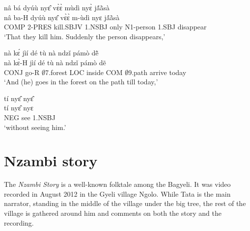 \begin{exe} 
\exA\label{25}
  \glll   nâ bá dyúù nyɛ̂ vɛ̀ɛ̀ mùdì nyɛ̀ jã́ã̀sà   \\
           nâ ba-H dyúù nyɛ̂ vɛ̀ɛ̀ m-ùdì nyɛ jã́ã̀sà      \\
         COMP 2-PRES kill.SBJV 1.NSBJ only N1-person 1.SBJ disappear \\
    \trans `That they kill him. Suddenly the person disappears,'
\end{exe}

\begin{exe} 
\exA\label{26}
  \glll    nà kɛ́ jìí dé tù nà ndzǐ pámò dẽ̂  \\
          nà kɛ̀-H jìí dé tù nà ndzǐ pámò dẽ   \\
         CONJ go-R $\emptyset$7.forest LOC inside COM $\emptyset$9.path arrive today \\
    \trans `And (he) goes in the forest on the path till today,'
\end{exe}

\begin{exe} 
\exA\label{27}
  \glll  tí nyɛ̂ nyɛ̂ \\
        tí nyɛ̂ nyɛ\\
           NEG see 1.NSBJ\\ 
    \trans `without seeing him.'
\end{exe}



\pagebreak







\section{Nzambi story}
\label{sec:Nzambi}

The {\itshape Nzambi Story} is a well-known folktale among the Bagyeli. It was video recorded in August 2012 in the Gyeli village Ngolo.  While Tata is the main narrator, standing in the middle of the village under the big tree, the rest of the village is gathered around him and comments on both the story and the recording.

